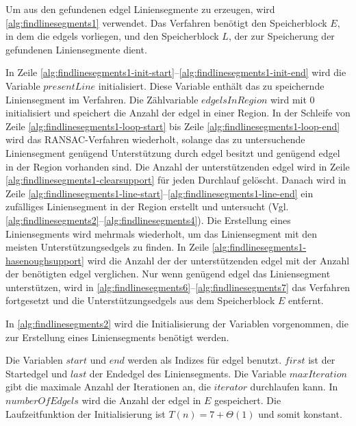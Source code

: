 Um aus den gefundenen \gls{edgel} Liniensegmente zu erzeugen, wird \autoref{alg:findlinesegments1} verwendet. Das
 Verfahren benötigt den Speicherblock $E$, in dem die \glspl{edgel} vorliegen, und den Speicherblock $L$, der zur
 Speicherung der gefundenen Liniensegmente dient.

In Zeile \ref{alg:findlinesegments1-init-start}--\ref{alg:findlinesegments1-init-end} wird die Variable
 $\mathit{presentLine}$ initialisiert. Diese Variable enthält das zu speichernde Liniensegment im Verfahren.
 Die Zählvariable $\mathit{edgelsInRegion}$ wird mit $0$ initialisiert und speichert die Anzahl der \gls{edgel} in
 einer Region. In der Schleife von Zeile \ref{alg:findlinesegments1-loop-start} bis Zeile
 \ref{alg:findlinesegments1-loop-end} wird das RANSAC-Verfahren wiederholt, solange das zu untersuchende Liniensegment
 genügend Unterstützung durch \gls{edgel} besitzt und genügend \gls{edgel} in der Region vorhanden sind. Die Anzahl der
 unterstützenden \gls{edgel} wird in Zeile \ref{alg:findlinesegments1-clearsupport} für jeden Durchlauf gelöscht.
 Danach wird in Zeile \ref{alg:findlinesegments1-line-start}--\ref{alg:findlinesegments1-line-end} ein zufälliges
 Liniensegment in der Region erstellt und untersucht
 (Vgl. \autoref{alg:findlinesegments2}--\autoref{alg:findlinesegments4}). Die Erstellung eines Liniensegments wird
 mehrmals wiederholt, um das Liniensegment mit den meisten Unterstützungsedgels zu finden. In Zeile
 \ref{alg:findlinesegments1-hasenoughsupport} wird die Anzahl der der unterstützenden \gls{edgel} mit der Anzahl der
 benötigten \gls{edgel} verglichen. Nur wenn genügend \gls{edgel} das Liniensegment unterstützen, wird in
 \autoref{alg:findlinesegments6}--\autoref{alg:findlinesegments7} das Verfahren fortgesetzt und die
 Unterstützungsedgels aus dem Speicherblock $E$ entfernt.

In \autoref{alg:findlinesegments2} wird die Initialisierung der Variablen vorgenommen, die zur Erstellung eines
 Liniensegments benötigt werden.

Die Variablen $\mathit{start}$ und $\mathit{end}$ werden als Indizes für \gls{edgel} benutzt. $\mathit{first}$ ist der
 Startedgel und $\mathit{last}$ der Endedgel des Liniensegments. Die Variable $\mathit{maxIteration}$ gibt die maximale
 Anzahl der Iterationen an, die $\mathit{iterator}$ durchlaufen kann. In $\mathit{numberOfEdgels}$ wird die Anzahl der
 \gls{edgel} in $E$ gespeichert. Die Laufzeitfunktion der Initialisierung ist $T(n) = 7 + \Theta(1)$ und somit
  konstant.

